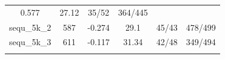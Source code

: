\documentclass[]{article}
\begin{document}
\begin{longtable}[]{@{}cccccc@{}}
\begin{minipage}[t]{0.11\columnwidth}
0.577\strut
\end{minipage} & \begin{minipage}[t]{0.13\columnwidth}\centering\strut
27.12\strut
\end{minipage} & \begin{minipage}[t]{0.18\columnwidth}\centering\strut
35/52\strut
\end{minipage} & \begin{minipage}[t]{0.22\columnwidth}\centering\strut
364/445\strut
\end{minipage}\tabularnewline
\begin{minipage}[t]{0.11\columnwidth}\centering\strut
sequ\_5k\_2\strut
\end{minipage} & \begin{minipage}[t]{0.07\columnwidth}\centering\strut
587\strut
\end{minipage} & \begin{minipage}[t]{0.11\columnwidth}\centering\strut
-0.274\strut
\end{minipage} & \begin{minipage}[t]{0.13\columnwidth}\centering\strut
29.1\strut
\end{minipage} & \begin{minipage}[t]{0.18\columnwidth}\centering\strut
45/43\strut
\end{minipage} & \begin{minipage}[t]{0.22\columnwidth}\centering\strut
478/499\strut
\end{minipage}\tabularnewline
\begin{minipage}[t]{0.11\columnwidth}\centering\strut
sequ\_5k\_3\strut
\end{minipage} & \begin{minipage}[t]{0.07\columnwidth}\centering\strut
611\strut
\end{minipage} & \begin{minipage}[t]{0.11\columnwidth}\centering\strut
-0.117\strut
\end{minipage} & \begin{minipage}[t]{0.13\columnwidth}\centering\strut
31.34\strut
\end{minipage} & \begin{minipage}[t]{0.18\columnwidth}\centering\strut
42/48\strut
\end{minipage} & \begin{minipage}[t]{0.22\columnwidth}\centering\strut
349/494\strut
\end{minipage}\tabularnewline
\begin{minipage}[t]{0.11\columnwidth}\centering\strut

\end{minipage}
\end{longtable}
\end{document}
